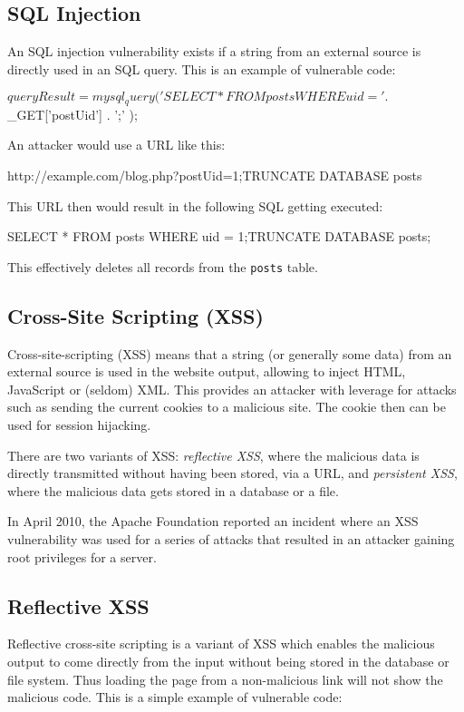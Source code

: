 \subsection{SQL Injection}
\label{sql-injection}
An SQL injection vulnerability exists if a string from an external source is directly used in an SQL query. This is an example of vulnerable code:

\begin{phpcode}
$queryResult = mysql_query(
  'SELECT * FROM posts WHERE uid = ' . $_GET['postUid'] . ';'
);
\end{phpcode}

An attacker would use a URL like this:

\begin{textcode}
http://example.com/blog.php?postUid=1;TRUNCATE DATABASE posts
\end{textcode}

This URL then would result in the following SQL getting executed:

\begin{sqlcode}
SELECT * FROM posts WHERE uid = 1;TRUNCATE DATABASE posts;
\end{sqlcode}

This effectively deletes all records from the \texttt{posts} table.


\subsection{Cross-Site Scripting (XSS)}
\label{xss}
Cross-site-scripting (XSS) means that a string (or generally some data) from an external source is used in the website output, allowing to inject HTML, JavaScript or (seldom) XML. This provides an attacker with leverage for attacks such as sending the current cookies to a malicious site. The cookie then can be used for session hijacking.

There are two variants of XSS: \emph{reflective XSS}, where the malicious data is directly transmitted without having been stored, \eg via a URL, and \emph{persistent XSS}, where the malicious data gets stored in a database or a file.

In April 2010, the Apache Foundation reported an incident where an XSS vulnerability was used for a series of attacks that resulted in an attacker gaining root privileges for a server. \cite{apache-incident-report}


\subsection{Reflective XSS}
Reflective cross-site scripting is a variant of XSS which enables the malicious output to come directly from the input without being stored in the database or file system. Thus loading the page from a non-malicious link will not show the malicious code. This is a simple example of vulnerable code:

